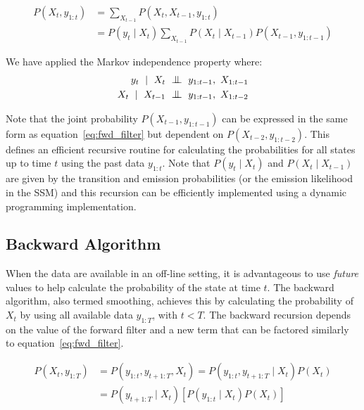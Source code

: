 \begin{equation}\label{eq:fwd_filter}
  \begin{split}
    P(X_t, y_{1:t}) &= \sum_{X_{t-1}} P(X_t, X_{t-1}, y_{1:t}) \\&= P(y_{t} \mid X_t) \sum_{X_{t-1}} P(X_t \mid X_{t-1})P(X_{t-1}, y_{1:t-1})
  \end{split}
\end{equation}

We have applied the Markov independence property where: 
\begin{equation}
	\begin{split}
	y_{t}~\mid~X_t &~\indep~y_{1:t-1},~X_{1:t-1} \\
    X_{t}~\mid~X_{t-1} &~\indep~y_{1:t-1},~X_{1:t-2}
    \end{split}
\end{equation}

Note that the joint probability $P(X_{t-1}, y_{1:t-1})$ can be expressed in the same form as equation~\ref{eq:fwd_filter} but dependent on $P(X_{t-2}, y_{1:t-2})$. This defines an efficient recursive routine for calculating the probabilities for all states up to time $t$ using the past data $y_{1:t}$. Note that $P(y_{t} \mid X_t)$ and $P(X_t \mid X_{t-1})$ are given by the transition and emission probabilities (or the emission likelihood in the SSM) and this recursion can be efficiently implemented using a dynamic programming implementation.

\subsection{Backward Algorithm}
When the data are available in an off-line setting, it is advantageous to use \textit{future} values to help calculate the probability of the state at time $t$. The backward algorithm, also termed smoothing, achieves this by calculating the probability of $X_t$ by using all available data $y_{1:T}$, with $t < T$. The backward recursion depends on the value of the forward filter and a new term that can be factored similarly to equation~\ref{eq:fwd_filter}.

\begin{equation}\label{eq:bkwd_filter1}
  \begin{split}
    P(X_t, y_{1:T}) &= P(y_{1:t}, y_{t+1:T}, X_t) =  P(y_{1:t}, y_{t+1:T} \mid X_t)P(X_t)\\ &= P(y_{t+1:T} \mid X_t)[P(y_{1:t} \mid X_t)P(X_t)]
  \end{split}
\end{equation}

